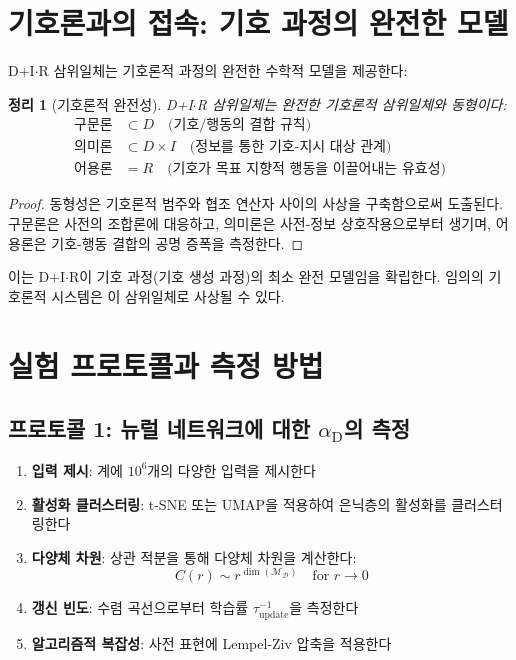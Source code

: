 \documentclass[11pt,a4paper]{article}
\newtheorem{theorem}{정리}
\DeclareMathOperator{\dimension}{dim}
\DeclareRobustCommand{\alD}{\texorpdfstring{\ensuremath{\alpha_{\mathrm{D}}}}{alpha_D}}
\newcommand{\Dict}{\mathcal{D}}
\newcommand{\Mdict}{\mathcal{M}_{\Dict}}
\begin{document}
	\section{기호론과의 접속: 기호 과정의 완전한 모델}
	
	D+I\(\cdot\)R 삼위일체는 기호론적 과정의 완전한 수학적 모델을 제공한다:
	
	\begin{theorem}[기호론적 완전성]
		D+I\(\cdot\)R 삼위일체는 완전한 기호론적 삼위일체와 동형이다:
		\begin{align*}
			\text{구문론} &\subset D \quad \text{(기호/행동의 결합 규칙)} \\
			\text{의미론} &\subset D \times I \quad \text{(정보를 통한 기호-지시 대상 관계)} \\
			\text{어용론} &= R \quad \text{(기호가 목표 지향적 행동을 이끌어내는 유효성)}
		\end{align*}
	\end{theorem}
	
	\begin{proof}
		동형성은 기호론적 범주와 협조 연산자 사이의 사상을 구축함으로써 도출된다. 구문론은 사전의 조합론에 대응하고, 의미론은 사전-정보 상호작용으로부터 생기며, 어용론은 기호-행동 결합의 공명 증폭을 측정한다.
	\end{proof}
	
	이는 D+I\(\cdot\)R이 기호 과정(기호 생성 과정)의 최소 완전 모델임을 확립한다. 임의의 기호론적 시스템은 이 삼위일체로 사상될 수 있다.
	
	\section{실험 프로토콜과 측정 방법}
	
	\subsection{프로토콜 1: 뉴럴 네트워크에 대한 \alD 의 측정}
	\label{subsec:protocol-alpha}
	
	\begin{enumerate}
		\item \textbf{입력 제시}: 계에 \(10^6\)개의 다양한 입력을 제시한다
		\item \textbf{활성화 클러스터링}: t-SNE 또는 UMAP을 적용하여 은닉층의 활성화를 클러스터링한다
		\item \textbf{다양체 차원}: 상관 적분을 통해 다양체 차원을 계산한다:
		\[
		C(r) \sim r^{\dimension(\Mdict)} \quad \text{for } r \to 0
		\]
		\item \textbf{갱신 빈도}: 수렴 곡선으로부터 학습률 \(\tau_{\mathrm{update}}^{-1}\)을 측정한다
		\item \textbf{알고리즘적 복잡성}: 사전 표현에 Lempel-Ziv 압축을 적용한다
	\end{enumerate}
	
\end{document}
